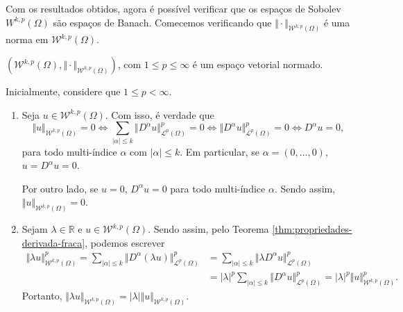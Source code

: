 \documentclass[a4paper, 11pt]{book}
\theoremstyle{definition}
\newcommand{\bR}{\mathbb{R}}
\newcommand{\cL}{\mathcal{L}}
\newcommand{\cW}{\mathcal{W}}
\begin{document}
Com os resultados obtidos, agora é possível verificar que os espaços de Sobolev $W^{k,p}(\Omega)$ são espaços de Banach. Comecemos verificando que $\Vert \cdot \Vert_{\cW^{k,p}(\Omega)}$ é uma norma em $\cW^{k,p}(\Omega)$.

\begin{tbox}
    $(\cW^{k,p}(\Omega), \Vert \cdot \Vert_{\cW^{k,p}(\Omega)})$, com $1 \leqslant p \leqslant \infty$ é um espaço vetorial normado.
\end{tbox}
\begin{prf}
    Inicialmente, considere que $1 \leqslant p < \infty$.
    \begin{enumerate}[leftmargin=*]
        \item Seja $u \in \cW^{k,p}(\Omega)$. Com isso, é verdade que
        \[
            \Vert u \Vert_{\cW^{k,p}(\Omega)} = 0 \iff \sum_{|\alpha| \leqslant k} \Vert D^\alpha u \Vert_{\cL^p(\Omega)}^p = 0 \iff \Vert D^\alpha u \Vert_{\cL^p(\Omega)}^p = 0 \iff D^\alpha u = 0,
        \]
        para todo multi-índice $\alpha$ com $|\alpha| \leqslant k$.
        Em particular, se $\alpha = (0,\dots,0)$, $u = D^\alpha u = 0$.

        Por outro lado, se $u = 0$, $D^\alpha u = 0$ para todo multi-índice $\alpha$. Sendo assim, $\Vert u \Vert_{\cW^{k,p}(\Omega)} = 0$.

        \item Sejam $\lambda \in \bR$ e $u \in \cW^{k,p}(\Omega)$. Sendo assim, pelo Teorema \ref{thm:propriedades-derivada-fraca}, podemos escrever
        \[
            \begin{aligned}
                \Vert \lambda u \Vert_{\cW^{k,p}(\Omega)}^p = \sum_{|\alpha| \leqslant k} \Vert D^\alpha (\lambda u) \Vert_{\cL^p(\Omega)}^p &= \sum_{|\alpha| \leqslant k} \Vert \lambda D^\alpha u \Vert_{\cL^p(\Omega)}^p\\ 
                &= |\lambda|^p\sum_{|\alpha| \leqslant k} \Vert D^\alpha u \Vert_{\cL^p(\Omega)}^p = |\lambda|^p\Vert u \Vert_{\cW^{k,p}(\Omega)}^p.
            \end{aligned}
        \]
        Portanto, $\Vert \lambda u \Vert_{\cW^{k,p}(\Omega)} = |\lambda|\Vert u \Vert_{\cW^{k,p}(\Omega)}$.


\end{enumerate}
\end{prf}
\end{document}

